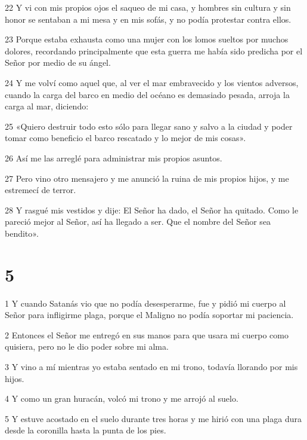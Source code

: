 \par 22 Y vi con mis propios ojos el saqueo de mi casa, y hombres sin cultura y sin honor se sentaban a mi mesa y en mis sofás, y no podía protestar contra ellos.

\par 23 Porque estaba exhausta como una mujer con los lomos sueltos por muchos dolores, recordando principalmente que esta guerra me había sido predicha por el Señor por medio de su ángel.

\par 24 Y me volví como aquel que, al ver el mar embravecido y los vientos adversos, cuando la carga del barco en medio del océano es demasiado pesada, arroja la carga al mar, diciendo:

\par 25 «Quiero destruir todo esto sólo para llegar sano y salvo a la ciudad y poder tomar como beneficio el barco rescatado y lo mejor de mis cosas».

\par 26 Así me las arreglé para administrar mis propios asuntos.

\par 27 Pero vino otro mensajero y me anunció la ruina de mis propios hijos, y me estremecí de terror.

\par 28 Y rasgué mis vestidos y dije: El Señor ha dado, el Señor ha quitado. Como le pareció mejor al Señor, así ha llegado a ser. Que el nombre del Señor sea bendito».

\chapter{5}

\par 1 Y cuando Satanás vio que no podía desesperarme, fue y pidió mi cuerpo al Señor para infligirme plaga, porque el Maligno no podía soportar mi paciencia.

\par 2 Entonces el Señor me entregó en sus manos para que usara mi cuerpo como quisiera, pero no le dio poder sobre mi alma.

\par 3 Y vino a mí mientras yo estaba sentado en mi trono, todavía llorando por mis hijos.

\par 4 Y como un gran huracán, volcó mi trono y me arrojó al suelo.

\par 5 Y estuve acostado en el suelo durante tres horas y me hirió con una plaga dura desde la coronilla hasta la punta de los pies.

